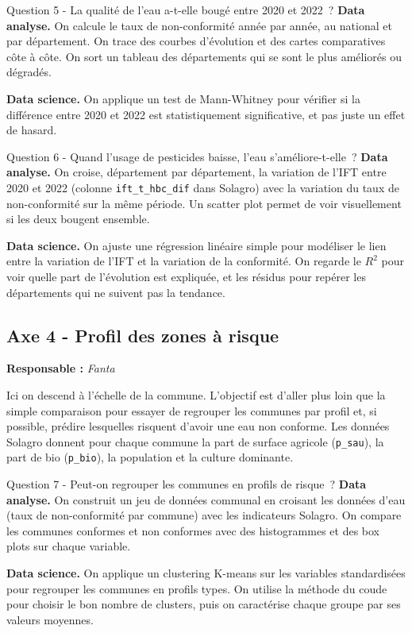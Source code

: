 \documentclass[a4paper,11pt]{article}
\begin{document}
\begin{questionbox}{Question 5 - La qualité de l'eau a-t-elle bougé entre 2020 et 2022~?}
\textbf{Data analyse.} On calcule le taux de non-conformité année par année, au national et par département. On trace des courbes d'évolution et des cartes comparatives côte à côte. On sort un tableau des départements qui se sont le plus améliorés ou dégradés.\par\smallskip
\textbf{Data science.} On applique un test de Mann-Whitney pour vérifier si la différence entre 2020 et 2022 est statistiquement significative, et pas juste un effet de hasard.
\end{questionbox}

\begin{questionbox}{Question 6 - Quand l'usage de pesticides baisse, l'eau s'améliore-t-elle~?}
\textbf{Data analyse.} On croise, département par département, la variation de l'IFT entre 2020 et 2022 (colonne \texttt{ift\_t\_hbc\_dif} dans Solagro) avec la variation du taux de non-conformité sur la même période. Un scatter plot permet de voir visuellement si les deux bougent ensemble.\par\smallskip
\textbf{Data science.} On ajuste une régression linéaire simple pour modéliser le lien entre la variation de l'IFT et la variation de la conformité. On regarde le $R^2$ pour voir quelle part de l'évolution est expliquée, et les résidus pour repérer les départements qui ne suivent pas la tendance.
\end{questionbox}

\subsection{Axe 4 - Profil des zones à risque}

\textbf{Responsable :} {\itshape Fanta}

Ici on descend à l'échelle de la commune. L'objectif est d'aller plus loin que la simple comparaison pour essayer de regrouper les communes par profil et, si possible, prédire lesquelles risquent d'avoir une eau non conforme. Les données Solagro donnent pour chaque commune la part de surface agricole (\texttt{p\_sau}), la part de bio (\texttt{p\_bio}), la population et la culture dominante.

\begin{questionbox}{Question 7 - Peut-on regrouper les communes en profils de risque~?}
\textbf{Data analyse.} On construit un jeu de données communal en croisant les données d'eau (taux de non-conformité par commune) avec les indicateurs Solagro. On compare les communes conformes et non conformes avec des histogrammes et des box plots sur chaque variable.\par\smallskip
\textbf{Data science.} On applique un clustering K-means sur les variables standardisées pour regrouper les communes en profils types. On utilise la méthode du coude pour choisir le bon nombre de clusters, puis on caractérise chaque groupe par ses valeurs moyennes.
\end{questionbox}
\end{document}
